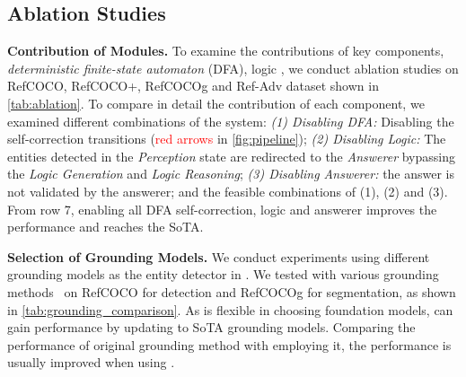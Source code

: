 \subsection{Ablation Studies}
\label{sec:ablation}

\noindent\textbf{Contribution of Modules.} To examine the contributions of key components, \emph{deterministic finite-state automaton} (DFA), logic , we conduct ablation studies on RefCOCO, RefCOCO+, RefCOCOg and Ref-Adv dataset shown in \autoref{tab:ablation}. To compare in detail the contribution of each component, we examined different combinations of the system:  \textit{(1) Disabling DFA:} Disabling the self-correction transitions (\textcolor{red}{red arrows} in \autoref{fig:pipeline}); \textit{(2) Disabling Logic:} The entities detected in the \emph{Perception} state are redirected to the \emph{Answerer} bypassing the \emph{Logic Generation} and \emph{Logic Reasoning}; \textit{(3) Disabling Answerer:} the answer is not validated by the answerer; and the feasible combinations of (1), (2) and (3). %
From row 7, enabling all DFA self-correction, logic and answerer improves the performance and reaches the SoTA. %


\noindent\textbf{Selection of Grounding Models.} We conduct experiments using different grounding models as the entity detector in \methodname{}. We tested \methodname{} with various grounding methods~\cite{li_grounded_2022, liu_grounding_2023, dai_simvg_2024, rasheed_glamm_2024}
on RefCOCO for detection and RefCOCOg for segmentation, as shown in \autoref{tab:grounding_comparison}. As \methodname{} is flexible in choosing foundation models, \methodname{} can gain performance by updating to SoTA grounding models. Comparing the performance of original grounding method with \methodname{} employing it, the performance is usually improved when using \methodname{}.

